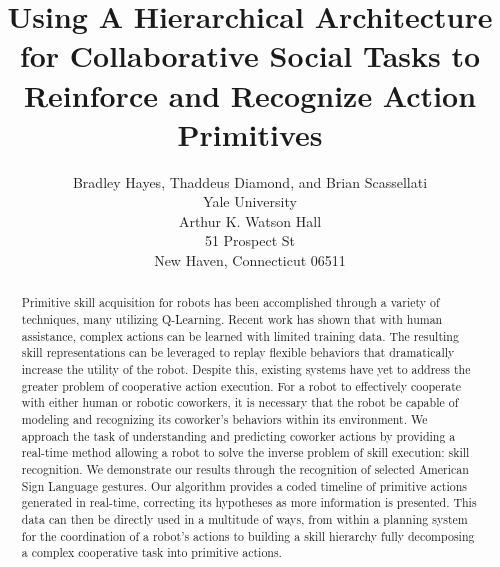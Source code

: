 \documentclass[letterpaper]{article}
\begin{document}
\title{Using A Hierarchical Architecture for Collaborative Social Tasks to Reinforce and Recognize Action Primitives}
\author{Bradley Hayes, Thaddeus Diamond, and Brian Scassellati\\
Yale University\\
Arthur K. Watson Hall\\
51 Prospect St\\
New Haven, Connecticut 06511\\
}

\maketitle

\begin{abstract}
Primitive skill acquisition for robots has been accomplished through a variety
of techniques, many utilizing Q-Learning. Recent work has shown that with human
assistance, complex actions can be learned with limited training data. The
resulting skill representations can be leveraged to replay flexible behaviors
that dramatically increase the utility of the robot. Despite this, existing
systems have yet to address the greater problem of cooperative action execution.
For a robot to effectively cooperate with either human or robotic coworkers,
it is necessary that the robot be capable of modeling and recognizing its
coworker’s behaviors within its environment. We approach the task of
understanding and predicting coworker actions by providing a real-time method
allowing a robot to solve the inverse problem of skill execution: skill
recognition. We demonstrate our results through the recognition of selected
American Sign Language gestures. Our algorithm provides a coded timeline of
primitive actions generated in real-time, correcting its hypotheses as more
information is presented. This data can then be directly used in a multitude
of ways, from within a planning system for the coordination of a robot's
actions to building a skill hierarchy fully decomposing a complex cooperative 
task into primitive actions.
\end{abstract}
\end{document}
